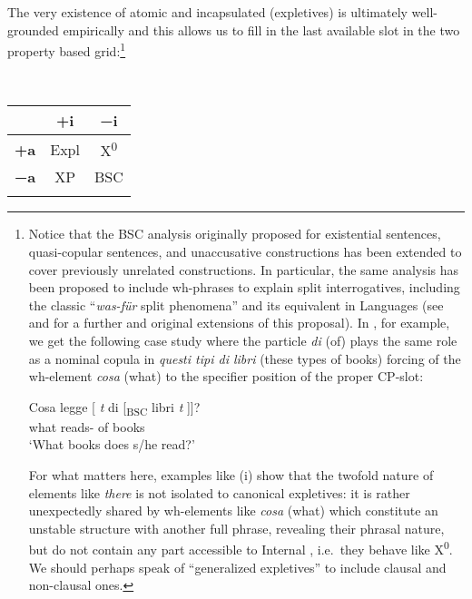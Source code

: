 \documentclass[output=paper]{langsci/langscibook}
\begin{document}
The very existence of atomic and incapsulated  (expletives)
is ultimately well-grounded empirically and this allows us to fill in the last
available slot in the two property based grid:\footnote{Notice that the
    \gls{BSC} analysis originally proposed for existential sentences,
    quasi-copular sentences, and unaccusative constructions has been extended
    to cover previously unrelated constructions. In particular, the same
    analysis has been proposed to include wh-phrases to explain split
    interrogatives, including the classic “\emph{was-für} split phenomena” and
    its equivalent in  Languages (see \citealt{Moro2000} and
    \citealt{Ott2012} for a further and original extensions of this proposal).
    In , for example, we get the following case study where the
    particle \emph{di} (of) plays the same role as a nominal copula
    in \emph{questi tipi di libri} (these types of books) forcing  of
    the wh-element \emph{cosa} (what) to the specifier position of the proper
    CP-slot:

\begin{exe}
	\gll Cosa legge [ \emph{t} di [\textsubscript{BSC}  libri  \emph{t} ]]?\\
		what reads-\Tsg{} {} {} of {} books {} {}\\
	\glt `What books does s/he read?'
\end{exe}

For what matters here, examples like (i) show that the twofold nature of
elements like \emph{there} is not isolated to canonical expletives: it is
rather unexpectedly shared by wh-elements like \emph{cosa} (what) which
constitute an unstable structure with another full phrase, revealing their
phrasal nature, but do not contain any part accessible to Internal , i.e.\
they behave like X\textsuperscript{0}. We should perhaps speak of “generalized
expletives” to include clausal and non-clausal ones.}

\newpage

\ea\label{ex:key:28.8}\leavevmode\\[-1\baselineskip] %
    \begin{tabular}{ccc}
    \lsptoprule
                & \textbf{+i} & \textbf{−i}\\
    \midrule
    \textbf{+a} & Expl        & X\textsuperscript{0}\\
    \textbf{−a} & XP          & BSC\\
    \lspbottomrule
    \end{tabular}
\z
\end{document}
